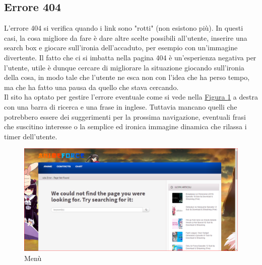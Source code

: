 \subsection{Errore 404}
L'errore 404 si verifica quando i link sono "rotti" (non esistono più). In questi casi, la cosa migliore da fare è dare altre scelte possibili all'utente, inserire una search box  e giocare sull'ironia dell'accaduto, per esempio con un’immagine divertente. Il fatto che ci si imbatta nella pagina 404 è un’esperienza negativa per l’utente, utile è dunque cercare di migliorare la situazione giocando sull'ironia della cosa, in modo tale che l’utente ne esca non con l’idea che ha perso tempo, ma che ha fatto una pausa da quello che stava cercando.  \\
Il sito ha optato per gestire l'errore eventuale come si vede nella \hyperref[img5]{Figura \ref{img5}} a destra con una barra di ricerca e una frase in inglese. Tuttavia mancano quelli che potrebbero essere dei suggerimenti per la prossima navigazione, eventuali frasi che suscitino interesse o la semplice ed ironica immagine dinamica che rilassa i timer dell'utente.
\begin{figure}[H]
	\centering
	\includegraphics[width=1\textwidth]{img/Errore404.png}
	\caption{Menù} 
	\label{img5} 
\end{figure}
